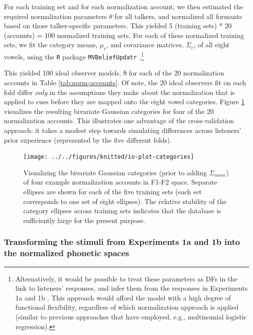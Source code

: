 \documentclass[preprint]{JASA}
\providecommand{\DIFadd}[1]{{\protect\color{blue}\uwave{#1}}} %
\providecommand{\DIFdel}[1]{{\protect\color{red}\sout{#1}}}                      %
\providecommand{\DIFaddbegin}{} %
\providecommand{\DIFaddend}{} %
\providecommand{\DIFdelbegin}{} %
\providecommand{\DIFdelend}{} %
\begin{document}
For each training set and for each normalization account, we then estimated the required normalization parameters \(\theta\) for all talkers, and normalized all formants based on those talker-specific parameters. This yielded 5 (training sets) * 20 (accounts) = 100 normalized training sets. For each of these normalized training sets, we fit the category means, \(\mu_c\), and covariance matrices, \(\Sigma_c\), of all eight vowels, using the \texttt{R} package \texttt{MVBeliefUpdatr} \citep{R-MVBeliefUpdatr}.\footnote{Alternatively, it would be possible to treat these parameters as DFs in the link to listeners' responses, and infer them from the responses in Experiments 1a and 1b \citep[cf.,][]{kleinschmidt-jaeger2016}. This approach would afford the model with a high degree of functional flexibility, regardless of which normalization approach is applied (similar to previous approaches that have employed, e.g., multinomial logistic regression).}

This yielded 100 ideal observer models, \DIFdelbegin \DIFdel{5 }\DIFdelend \DIFaddbegin \DIFadd{five }\DIFaddend for each of the 20 normalization accounts in Table \ref{tab:norm-accounts}. Of note, the 20 ideal observers fit on each fold differ \emph{only} in the assumptions they make about the normalization that is applied to cues before they are mapped onto the eight vowel categories. Figure \ref{fig:io-plot-categories} visualizes the resulting bivariate Gaussian categories for four of the 20 normalization accounts. This illustrates one advantage of the cross-validation approach: it takes a modest step towards simulating differences across listeners' prior experience (represented by the five different folds).



\begin{figure}[!ht]

{\centering \texttt{[image: ../../figures/knitted/io-plot-categories]} 

}

\caption{Visualizing the bivariate Gaussian categories (prior to adding \(\Sigma_{noise}\)) of four example normalization accounts in F1-F2 space. Separate ellipses are shown for each of the five training sets (each set corresponds to one set of eight ellipses). The relative stability of the category ellipses across training sets indicates that the database is sufficiently large for the present purpose.}\label{fig:io-plot-categories}
\end{figure}

\subsubsection{Transforming the stimuli from Experiments 1a and 1b into the normalized phonetic spaces}\label{transforming-the-stimuli-from-experiments-1a-and-1b-into-the-normalized-phonetic-spaces}
\end{document}

